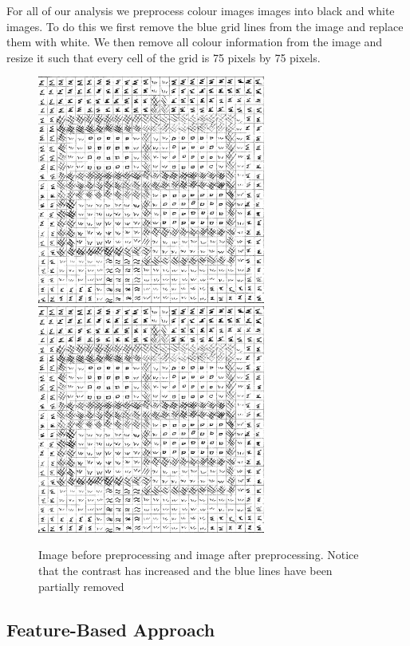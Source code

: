\documentclass[preprint,3p,12pt]{elsarticle}
\begin{document}
For all of our analysis we preprocess colour images images into black and white
images. To do this we first remove the blue grid lines from the image and
replace them with white. We then remove all colour information from the image
and resize it such that every cell of the grid is 75 pixels by 75 pixels.

\begin{figure}[h]
    \begin{center}
    \includegraphics[width=7.5cm, height=7.5cm]{preprocessing-final}
    \includegraphics[width=7.5cm, height=7.5cm]{preprocessing-final}

    \caption{Image before preprocessing and image after preprocessing. Notice
        that the contrast has increased and the blue lines have been partially
        removed}

    \end{center}
\end{figure}

\subsection{Feature-Based Approach}
\label{process:featurebased}
\lipsum[1]
\end{document}
